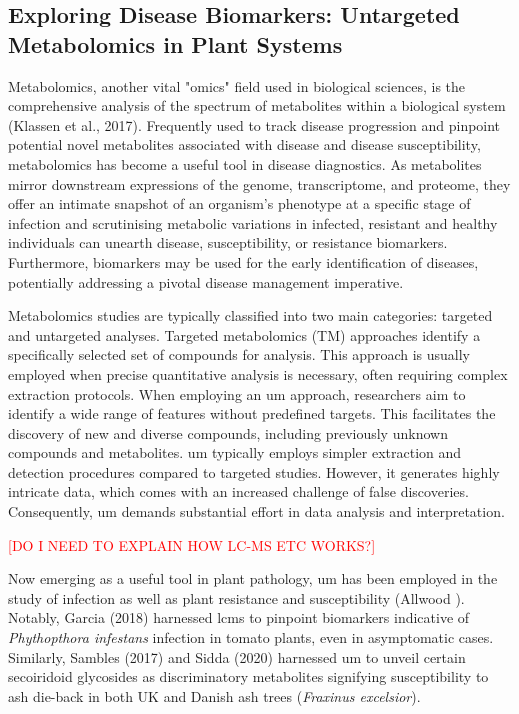 \subsection{Exploring Disease Biomarkers: Untargeted Metabolomics in Plant Systems}

Metabolomics, another vital "omics" field used in biological sciences, is the comprehensive analysis of the spectrum of metabolites within a biological system (Klassen et al., 2017). Frequently used to track disease progression and pinpoint potential novel metabolites associated with disease and disease susceptibility, metabolomics has become a useful tool in disease diagnostics. As metabolites mirror downstream expressions of the genome, transcriptome, and proteome, they offer an intimate snapshot of an organism's phenotype at a specific stage of infection and scrutinising metabolic variations in infected, resistant and healthy individuals can unearth disease, susceptibility, or resistance biomarkers. Furthermore, biomarkers may be used for the early identification of diseases, potentially addressing a pivotal disease management imperative. 

Metabolomics studies are typically classified into two main categories: targeted and untargeted analyses. Targeted metabolomics (TM) approaches identify a specifically selected set of compounds for analysis. This approach is usually employed when precise quantitative analysis is necessary, often requiring complex extraction protocols. When employing an \ac{um} approach, researchers aim to identify a wide range of features without predefined targets. This facilitates the discovery of new and diverse compounds, including previously unknown compounds and metabolites. \ac{um} typically employs simpler extraction and detection procedures compared to targeted studies. However, it generates highly intricate data, which comes with an increased challenge of false discoveries. Consequently, \ac{um} demands substantial effort in data analysis and interpretation.

\textcolor{red}{[DO I NEED TO EXPLAIN HOW LC-MS ETC WORKS?]}

Now emerging as a useful tool in plant pathology, \ac{um} has been employed in the study of infection as well as plant resistance and susceptibility (Allwood ). Notably, Garcia \et (2018) harnessed \ac{lcms} to pinpoint biomarkers indicative of \textit{Phythopthora infestans} infection in tomato plants, even in asymptomatic cases. Similarly, Sambles \et (2017) and Sidda \et (2020) harnessed \ac{um} to unveil certain secoiridoid glycosides as discriminatory metabolites signifying susceptibility to ash die-back in both UK and Danish ash trees (\textit{Fraxinus excelsior}).

